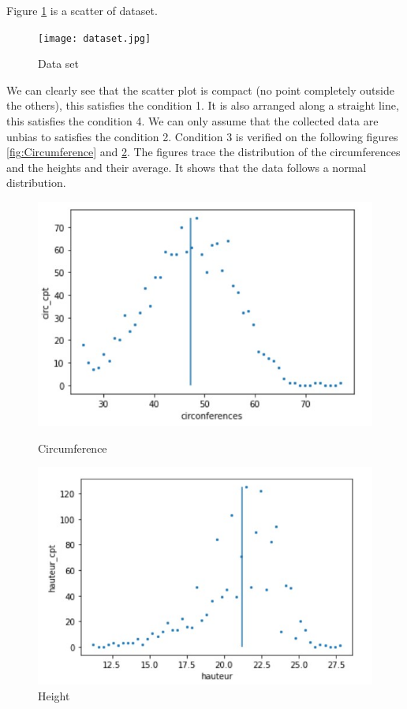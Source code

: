 \documentclass[
	12pt, %
]{article}
\theoremstyle{definition}
\begin{document}
Figure \ref{fig:regression} is a scatter of dataset.

\begin{figure}[H]
	\texttt{[image: dataset.jpg]}
    \caption{Data set}
    \label{fig:regression}
\end{figure}


We can clearly see that the scatter plot is compact (no point completely outside the others), this satisfies the condition 1. It is also arranged along a straight line, this satisfies the condition 4. We can only assume that the collected data are unbias to satisfies the condition 2. Condition 3 is verified on the following figures \ref{fig:Circumference} and \ref{fig:Height}. The figures trace the distribution of the circumferences and the heights and their average. It shows that the data follows a normal distribution.


\begin{figure}[H]
    \centering
    \begin{minipage}{0.45\textwidth}
        \centering
            \includegraphics[scale=0.5]{circ_normale.jpg}
            \caption{Circumference}
            \label{fig:Circumference}
    \end{minipage}\hfill
    \begin{minipage}{0.45\textwidth}
        \centering
        \includegraphics[scale=0.5]{hauteur_normale.jpg}
        \caption{Height}
        \label{fig:Height}
    \end{minipage}
\end{figure}
\end{document}
